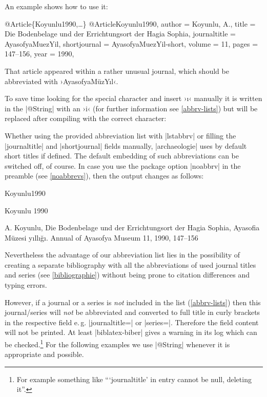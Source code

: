 \documentclass[a4paper,
10pt,
greek,
french,
spanish,
italian,
ngerman,
english
]{ltxdoc}
\begin{document}
An example shows how to use it:

\begin{bibexample}[label=Koyunlu1990]{{@}Article\{Koyunlu1990,…\}}
@Article{Koyunlu1990,
  author       = {Koyunlu, A.},
  title        = {Die Bodenbelage und der Errichtungsort der Hagia Sophia},
  journaltitle = AyasofyaMuezYil,  %
  shortjournal = AyasofyaMuezYil-short,  %
  volume       = {11},
  pages        = {147--156},
  year         = {1990},
}
\end{bibexample}


That article appeared within a rather unusual journal, 
which should be abbreviated with ›AyasofyaMüzYıl‹.

To save  time  looking for the special character and insert ›ı‹ manually 
it is written in the |@String| with an ›i‹ (for further information see \cref{abbrv-lists}) but will be replaced after compiling with the correct character:



Whether using the provided abbreviation list with |lstabbrv| or filling the |journaltitle| and |shortjournal| fields manually, 
|archaeologie| uses by default short titles if defined.
The default embedding of such abbreviations can be switched off, of course.
In case you use the package option |noabbrv| in the preamble (see \cref{noabbrevs}), then the output changes as follows:
\begin{bibbox}{Koyunlu1990}\footnotesize
\parbox[t]{2cm}{Koyunlu 1990} \parbox[t]{9cm}{A. Koyunlu, 
Die Bodenbelage und der Errichtungsort der Hagia Sophia, {\color{red}Ayasofia Müzesi yıllığı. Annual of Ayasofya Museum} 11, 1990, 147–156}
\end{bibbox}
Nevertheless the advantage of our abbreviation list lies in the possibility of creating a separate bibliography 
with all the abbreviations of used journal titles and series (see \cref{bibliographie}) without being prone to citation differences and typing errors.

However, if a journal or a series is \emph{not} included in the list (\cref{abbrv-lists}) 
then this journal/series will \emph{not} be abbreviated and converted to full title in curly brackets in the respective field e.\,g. |journaltitle=| or |series=|. 
Therefore the field content will not be printed. 
At least |biblatex-biber| gives a warning in its log which can be checked.\footnote{For example something like \enquote{\enquote{journaltitle} in entry  cannot be null, deleting it}.}
For the following examples we use |@String| whenever it is appropriate and possible.
\end{document}
